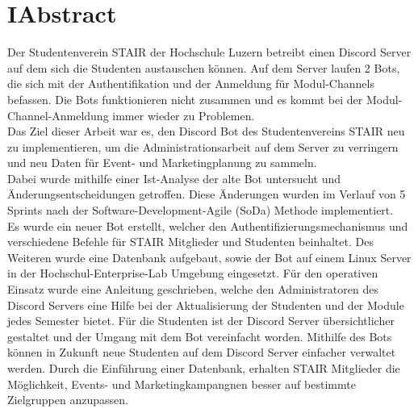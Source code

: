 \documentclass[a4paper, table]{article}
\begin{document}
\section*{I{\hspace*{1cm}}Abstract}
Der Studentenverein STAIR der Hochschule Luzern betreibt einen Discord Server auf dem sich die Studenten austauschen können.
Auf dem Server laufen 2 Bots, die sich mit der Authentifikation und der Anmeldung für Modul-Channels befassen.
Die Bots funktionieren nicht zusammen und es kommt bei der Modul-Channel-Anmeldung immer wieder zu Problemen.\\
Das Ziel dieser Arbeit war es, den Discord Bot des Studentenvereins STAIR neu zu implementieren, 
um die Administrationsarbeit auf dem Server zu verringern und neu Daten für Event- und Marketingplanung zu sammeln.\\
Dabei wurde mithilfe einer Ist-Analyse der alte Bot untersucht und Änderungsentscheidungen getroffen.
Diese Änderungen wurden im Verlauf von 5 Sprints nach der Software-Development-Agile (SoDa) Methode implementiert.\\
Es wurde ein neuer Bot erstellt, welcher den Authentifizierungsmechanismus und verschiedene Befehle für STAIR Mitglieder und Studenten beinhaltet.
Des Weiteren wurde eine Datenbank aufgebaut, sowie der Bot auf einem Linux Server in der Hochschul-Enterprise-Lab Umgebung eingesetzt.
Für den operativen Einsatz wurde eine Anleitung geschrieben, welche den Administratoren des Discord Servers eine Hilfe bei der Aktualisierung der Studenten und der Module jedes Semester bietet.
Für die Studenten ist der Discord Server übersichtlicher gestaltet und der Umgang mit dem Bot vereinfacht worden.
Mithilfe des Bots können in Zukunft neue Studenten auf dem Discord Server einfacher verwaltet werden.
Durch die Einführung einer Datenbank, erhalten STAIR Mitglieder die Möglichkeit, Events- und Marketingkampangnen besser auf bestimmte Zielgruppen anzupassen.

\newpage

\tableofcontents

\newpage
\end{document}
